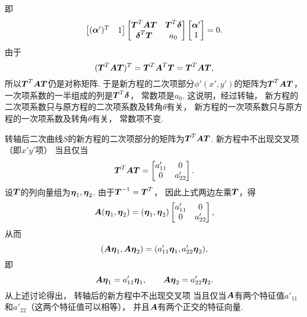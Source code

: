 即\begin{equation*}
	\begin{bmatrix}
		(\boldsymbol\alpha')^T & 1
	\end{bmatrix}
	\begin{bmatrix}
		\boldsymbol{T}^T \boldsymbol{A} \boldsymbol{T} & \boldsymbol{T}^T \boldsymbol\delta \\
		\boldsymbol\delta^T \boldsymbol{T} & a_0
	\end{bmatrix}
	\begin{bmatrix}
		\boldsymbol\alpha' \\ 1
	\end{bmatrix}
	= 0.
\end{equation*}
由于\begin{equation*}
	(\boldsymbol{T}^T \boldsymbol{A} \boldsymbol{T})^T
	= \boldsymbol{T}^T \boldsymbol{A}^T \boldsymbol{T}
	= \boldsymbol{T}^T \boldsymbol{A} \boldsymbol{T},
\end{equation*}
所以\(\boldsymbol{T}^T \boldsymbol{A} \boldsymbol{T}\)仍是对称矩阵.
于是新方程的二次项部分\(\phi'(x',y')\)的矩阵为\(\boldsymbol{T}^T \boldsymbol{A} \boldsymbol{T}\)，
一次项系数的一半组成的列是\(\boldsymbol{T}^T \boldsymbol\delta\)，
常数项是\(a_0\).
这说明，经过转轴，
新方程的二次项系数只与原方程的二次项系数及转角\(\theta\)有关，
新方程的一次项系数只与原方程的一次项系数及转角\(\theta\)有关，
常数项不变.

转轴后二次曲线\(S\)的新方程的二次项部分的矩阵为\(\boldsymbol{T}^T \boldsymbol{A} \boldsymbol{T}\).
新方程中不出现交叉项（即\(x' y'\)项）
当且仅当\begin{equation*}
	\boldsymbol{T}^T \boldsymbol{A} \boldsymbol{T}
	= \begin{bmatrix}
		a'_{11} & 0 \\
		0 & a'_{22}
	\end{bmatrix}.
\end{equation*}
设\(\boldsymbol{T}\)的列向量组为\(\boldsymbol\eta_1,\boldsymbol\eta_2\).
由于\(\boldsymbol{T}^{-1} = \boldsymbol{T}^T\)，
因此上式两边左乘\(\boldsymbol{T}\)，得\begin{equation*}
	\boldsymbol{A} (\boldsymbol\eta_1,\boldsymbol\eta_2)
	= (\boldsymbol\eta_1,\boldsymbol\eta_2)
	\begin{bmatrix}
		a'_{11} & 0 \\
		0 & a'_{22}
	\end{bmatrix},
\end{equation*}
从而\begin{equation*}
	(\boldsymbol{A} \boldsymbol\eta_1,\boldsymbol{A} \boldsymbol\eta_2)
	= (a'_{11} \boldsymbol\eta_1,a'_{22} \boldsymbol\eta_2),
\end{equation*}
即\begin{equation*}
	\boldsymbol{A} \boldsymbol\eta_1
	= a'_{11} \boldsymbol\eta_1,
	\qquad
	\boldsymbol{A} \boldsymbol\eta_2
	= a'_{22} \boldsymbol\eta_2.
\end{equation*}
从上述讨论得出，
转轴后的新方程中不出现交叉项
当且仅当\(\boldsymbol{A}\)有两个特征值\(a'_{11}\)和\(a'_{22}\)（这两个特征值可以相等），
并且\(\boldsymbol{A}\)有两个正交的特征向量.

